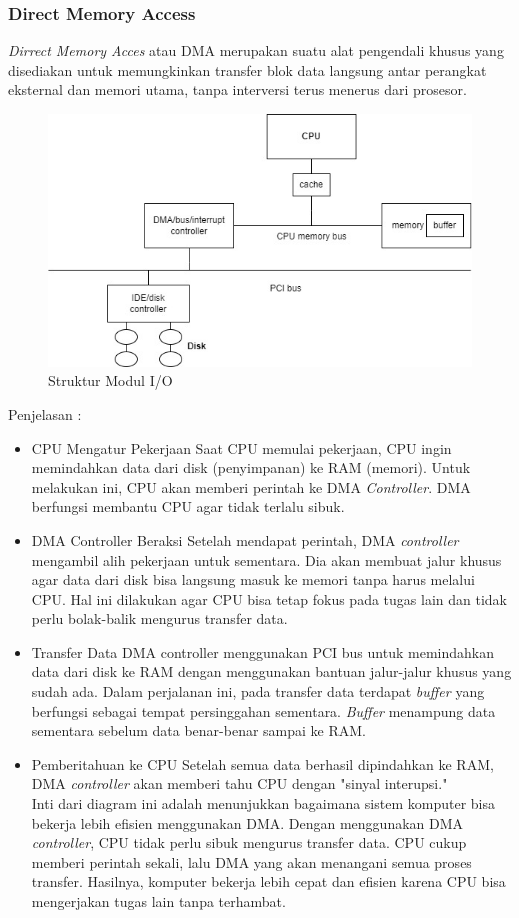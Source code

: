 \documentclass[12pt]{article}
\begin{document}
\subsubsection{Direct Memory Access}
\textit{Dirrect Memory Acces} atau DMA merupakan suatu alat pengendali khusus yang disediakan untuk memungkinkan transfer blok data langsung antar perangkat eksternal dan memori utama, tanpa interversi terus menerus dari prosesor. \\
\begin{figure}[h]
    \centering
    \includegraphics[width=0.80\linewidth]{b_class/asset/I_O.jpg}
    \caption{Struktur Modul I/O}
    \label{fig:enter-label}
\end{figure}
Penjelasan :
\begin{itemize}
    \item CPU Mengatur Pekerjaan
    Saat CPU memulai pekerjaan, CPU ingin memindahkan data dari disk (penyimpanan) ke RAM (memori). Untuk melakukan ini, CPU akan memberi perintah ke DMA \textit{Controller}. DMA berfungsi membantu CPU agar tidak terlalu sibuk.
    \item DMA Controller Beraksi
    Setelah mendapat perintah, DMA \textit{controller} mengambil alih pekerjaan untuk sementara. Dia akan membuat jalur khusus agar data dari disk bisa langsung masuk ke memori tanpa harus melalui CPU. Hal ini dilakukan agar CPU bisa tetap fokus pada tugas lain dan tidak perlu bolak-balik mengurus transfer data.
    \item Transfer Data
    DMA controller menggunakan PCI bus untuk memindahkan data dari disk ke RAM dengan menggunakan bantuan jalur-jalur khusus yang sudah ada. Dalam perjalanan ini, pada transfer data terdapat \textit{buffer} yang berfungsi sebagai tempat persinggahan sementara. \textit{Buffer} menampung data sementara sebelum data benar-benar sampai ke RAM.
    \item Pemberitahuan ke CPU
    Setelah semua data berhasil dipindahkan ke RAM, DMA \textit{controller} akan memberi tahu CPU dengan "sinyal interupsi." \\
    Inti dari diagram ini adalah menunjukkan bagaimana sistem komputer bisa bekerja lebih efisien menggunakan DMA. Dengan menggunakan DMA \textit{controller}, CPU tidak perlu sibuk mengurus transfer data. CPU cukup memberi perintah sekali, lalu DMA yang akan menangani semua proses transfer. Hasilnya, komputer bekerja lebih cepat dan efisien karena CPU bisa mengerjakan tugas lain tanpa terhambat.
\end{itemize}
\end{document}
